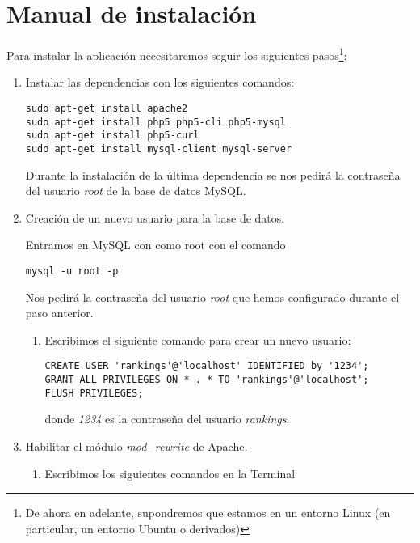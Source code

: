 \chapter{Manual de instalación}

Para instalar la aplicación necesitaremos seguir los siguientes pasos\footnote{De ahora en adelante, supondremos que estamos en un entorno Linux (en particular, un entorno Ubuntu o derivados)}:

\begin{enumerate}
\item Instalar las dependencias con los siguientes comandos:

\begin{verbatim}
sudo apt-get install apache2
sudo apt-get install php5 php5-cli php5-mysql
sudo apt-get install php5-curl
sudo apt-get install mysql-client mysql-server
\end{verbatim}

Durante la instalación de la última dependencia se nos pedirá la contraseña del usuario \emph{root} de la base de datos MySQL.

\item Creación de un nuevo usuario para la base de datos. 

Entramos en MySQL con como root con el comando

\begin{verbatim}
mysql -u root -p
\end{verbatim}

Nos pedirá la contraseña del usuario \emph{root} que hemos configurado durante el paso anterior.

\begin{enumerate}
\item Escribimos el siguiente comando para crear un nuevo usuario:

\begin{verbatim}
CREATE USER 'rankings'@'localhost' IDENTIFIED by '1234';
GRANT ALL PRIVILEGES ON * . * TO 'rankings'@'localhost';
FLUSH PRIVILEGES;
\end{verbatim}

donde \emph{1234} es la contraseña del usuario \emph{rankings}.
\end{enumerate}

\item Habilitar el módulo \emph{mod\_rewrite} de Apache.

\begin{enumerate}
\item Escribimos los siguientes comandos en la Terminal


\end{enumerate}
\end{enumerate}
